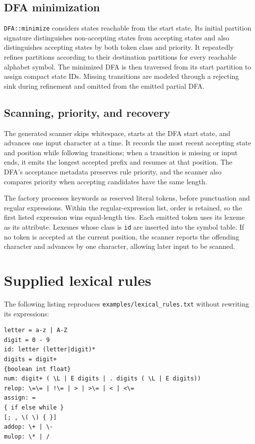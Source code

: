 \documentclass[11pt,a4paper]{article}
\newcommand{\code}[1]{\texttt{#1}}
\begin{document}
\subsection{DFA minimization}

\code{DFA::minimize} considers states reachable from the start state.
Its initial partition signature distinguishes non-accepting states from
accepting states and also distinguishes accepting states by both token
class and priority. It repeatedly refines partitions according to their
destination partitions for every reachable alphabet symbol. The
minimized DFA is then traversed from its start partition to assign
compact state IDs. Missing transitions are modeled through a rejecting
sink during refinement and omitted from the emitted partial DFA.

\subsection{Scanning, priority, and recovery}

The generated scanner skips whitespace, starts at the DFA start state,
and advances one input character at a time. It records the most recent
accepting state and position while following transitions; when a
transition is missing or input ends, it emits the longest accepted
prefix and resumes at that position. The DFA's acceptance metadata
preserves rule priority, and the scanner also compares priority when
accepting candidates have the same length.

The factory processes keywords as reserved literal tokens, before
punctuation and regular expressions. Within the regular-expression
list, order is retained, so the first listed expression wins equal-length
ties. Each emitted token uses its lexeme as its attribute. Lexemes whose
class is \code{id} are inserted into the symbol table. If no token is
accepted at the current position, the scanner reports the offending
character and advances by one character, allowing later input to be
scanned.

\section{Supplied lexical rules}

The following listing reproduces \code{examples/lexical\_rules.txt}
without rewriting its expressions:

\begin{lstlisting}
letter = a-z | A-Z
digit = 0 - 9
id: letter (letter|digit)*
digits = digit+
{boolean int float}
num: digit+ ( \L | E digits | . digits ( \L | E digits))
relop: \=\= | !\= | > | >\= | < | <\=
assign: =
{ if else while }
[; , \( \) { }]
addop: \+ | \-
mulop: \* | /
\end{lstlisting}
\end{document}
